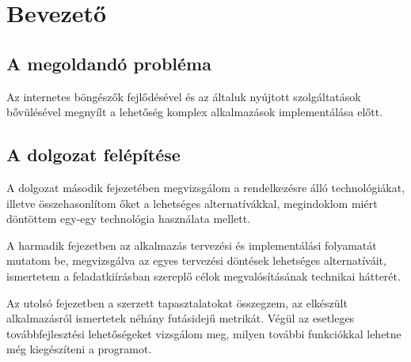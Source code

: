 \chapter{Bevezető}

\section{A megoldandó probléma}

Az internetes böngészők fejlődésével és az általuk nyújtott szolgáltatások
bővülésével megnyílt a lehetőség komplex alkalmazások implementálása előtt.


\section{A dolgozat felépítése}

A dolgozat második fejezetében megvizsgálom a rendelkezésre álló
technológiákat, illetve összehasonlítom őket a lehetséges alternatívákkal,
megindoklom miért döntöttem egy-egy technológia használata mellett.

A harmadik fejezetben az alkalmazás tervezési és implementálási folyamatát
mutatom be, megvizsgálva az egyes tervezési döntések lehetséges alternatíváit,
ismertetem a feladatkiírásban szereplő célok megvalósításának technikai
hátterét.

Az utolsó fejezetben a szerzett tapasztalatokat összegzem, az elkészült
alkalmazásról ismertetek néhány futásidejű metrikát.
Végül az esetleges továbbfejlesztési lehetőségeket vizsgálom meg,
milyen további funkciókkal lehetne még kiegészíteni a programot.
